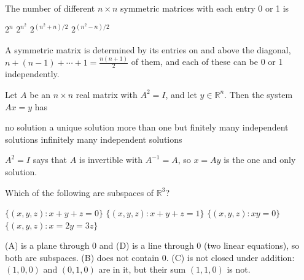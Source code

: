 \begin{question}[id=gate-cs2004-3, source=GATE CS 2004, marks=2]
The number of different $n \times n$ symmetric matrices with each entry 0 or 1 is
\begin{options}
  \option $2^n$
  \option $2^{n^2}$
  \correct $2^{(n^2 + n)/2}$
  \option $2^{(n^2 - n)/2}$
\end{options}
\begin{solution}
A symmetric matrix is determined by its entries on and above the diagonal, $n + (n - 1) + \cdots + 1 = \frac{n(n + 1)}{2}$ of them, and each of these can be 0 or 1 independently.
\end{solution}
\end{question}

\begin{question}[id=gate-in2007-1, source=GATE IN 2007]
Let $A$ be an $n \times n$ real matrix with $A^2 = I$, and let $y \in \mathbb{R}^n$. Then the system $Ax = y$ has
\begin{options}
  \option no solution
  \correct a unique solution
  \option more than one but finitely many independent solutions
  \option infinitely many independent solutions
\end{options}
\begin{solution}
$A^2 = I$ says that $A$ is invertible with $A^{-1} = A$, so $x = Ay$ is the one and only solution.
\end{solution}
\end{question}


\begin{question}[id=vs-1, type=msq, marks=2]
Which of the following are subspaces of $\mathbb{R}^3$?
\begin{options}
  \correct $\{(x, y, z) : x + y + z = 0\}$
  \option $\{(x, y, z) : x + y + z = 1\}$
  \option $\{(x, y, z) : xy = 0\}$
  \correct $\{(x, y, z) : x = 2y = 3z\}$
\end{options}
\begin{solution}
(A) is a plane through 0 and (D) is a line through 0 (two linear equations), so both are subspaces. (B) does not contain 0. (C) is not closed under addition: $(1,0,0)$ and $(0,1,0)$ are in it, but their sum $(1,1,0)$ is not.
\end{solution}
\end{question}

